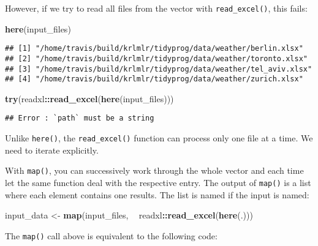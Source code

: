 \documentclass[]{book}
\newenvironment{Shaded}{\begin{snugshade}}{\end{snugshade}}
\newcommand{\KeywordTok}[1]{\textcolor[rgb]{0.13,0.29,0.53}{\textbf{#1}}}
\newcommand{\NormalTok}[1]{#1}
\newcommand{\OperatorTok}[1]{\textcolor[rgb]{0.81,0.36,0.00}{\textbf{#1}}}
\newcommand{\StringTok}[1]{\textcolor[rgb]{0.31,0.60,0.02}{#1}}
\begin{document}
However, if we try to read all files from the vector with \texttt{read\_excel()}, this fails:

\begin{Shaded}
\begin{Highlighting}[]
\KeywordTok{here}\NormalTok{(input_files)}
\end{Highlighting}
\end{Shaded}

\begin{verbatim}
## [1] "/home/travis/build/krlmlr/tidyprog/data/weather/berlin.xlsx"  
## [2] "/home/travis/build/krlmlr/tidyprog/data/weather/toronto.xlsx" 
## [3] "/home/travis/build/krlmlr/tidyprog/data/weather/tel_aviv.xlsx"
## [4] "/home/travis/build/krlmlr/tidyprog/data/weather/zurich.xlsx"
\end{verbatim}

\begin{Shaded}
\begin{Highlighting}[]
\KeywordTok{try}\NormalTok{(readxl}\OperatorTok{::}\KeywordTok{read_excel}\NormalTok{(}\KeywordTok{here}\NormalTok{(input_files)))}
\end{Highlighting}
\end{Shaded}

\begin{verbatim}
## Error : `path` must be a string
\end{verbatim}

Unlike \texttt{here()}, the \texttt{read\_excel()} function can process only one file at a time.
We need to iterate explicitly.

With \texttt{map()}, you can successively work through the whole vector and each time let the same function deal with the respective entry.
The output of \texttt{map()} is a list where each element contains one results.
The list is named if the input is named:

\begin{Shaded}
\begin{Highlighting}[]
\NormalTok{input_data <-}
\StringTok{  }\KeywordTok{map}\NormalTok{(input_files, }\OperatorTok{~}\StringTok{ }\NormalTok{readxl}\OperatorTok{::}\KeywordTok{read_excel}\NormalTok{(}\KeywordTok{here}\NormalTok{(.)))}
\end{Highlighting}
\end{Shaded}

The \texttt{map()} call above is equivalent to the following code:
\end{document}
